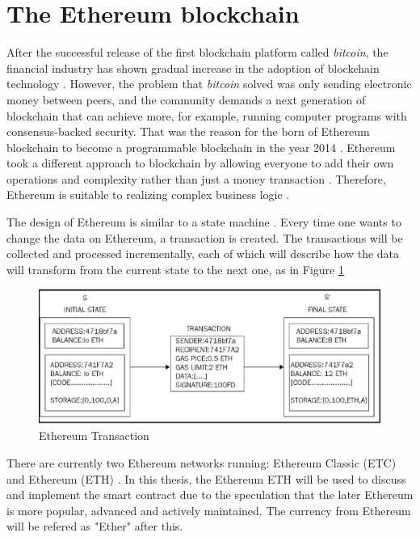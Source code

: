 \section{The Ethereum blockchain}

After the successful release of the first blockchain platform called \textit{bitcoin}, the financial industry has shown gradual increase in the adoption of blockchain technology \citep{BlockchainGradualAdoption}. However, the problem that \textit{bitcoin} solved was only sending electronic money between peers, and the community demands a next generation of blockchain that can achieve more, for example, running computer programs with consensus-backed security. That was the reason for the born of Ethereum blockchain to become a programmable blockchain in the year 2014 \citep{Ethdocorg:WhatIsEthereum}. Ethereum took a different approach to blockchain by allowing everyone to add their own operations and complexity rather than just a money transaction \citep{RefWorks:doc:MasteringBlockchain}. Therefore, Ethereum is suitable to realizing complex business logic \citep{RefWorks:doc:EthereumStateOfKnowledge}.

The design of Ethereum is similar to a state machine \citep{RefWorks:doc:EthereumStateOfKnowledge}\citep{RefWorks:doc:MasteringBlockchain}\citep{RefWorks:doc:EthereumASecureDecentralizedTransaction}. Every time one wants to change the data on Ethereum, a transaction is created. The transactions will be collected and processed incrementally, each of which will describe how the data will transform from the current state to the next one, as in Figure \ref{fig:ethereum_transaction}

\begin{figure}
    \centering
    \includegraphics[width=\linewidth]{ethereum_transaction.jpg}
    \caption{Ethereum Transaction \citep{RefWorks:doc:MasteringBlockchain}}
    \label{fig:ethereum_transaction}
\end{figure}

There are currently two Ethereum networks running: Ethereum Classic (ETC) \citep{EthereumClassic} and Ethereum (ETH) \citep{Ethereum}. In this thesis, the Ethereum ETH will be used to discuss and implement the smart contract due to the speculation that the later Ethereum is more popular, advanced and actively maintained. The currency from Ethereum will be refered as "Ether" after this.

